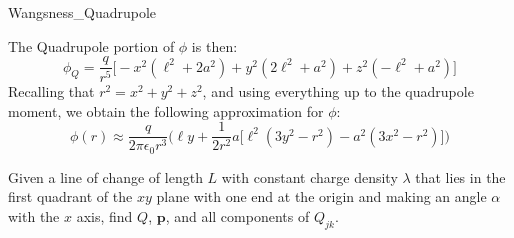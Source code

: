 \begin{solution}
\begin{table}[H]
{                               Wangsness_Quadrupole}
                    \end{table}
                    The Quadrupole portion of $\phi$ is then:
                    \begin{equation}
                        \phi_{Q}=\frac{q}{r^{5}}\Big[
                            \minus{x}^{2}(\ell^{2}+2a^{2})
                            +y^{2}(2\ell^{2}+a^{2})
                            +z^{2}(\minus\ell^{2}+a^{2})\Big]
                    \end{equation}
                    Recalling that $r^{2}=x^{2}+y^{2}+z^{2}$, and using
                    everything up to the quadrupole moment, we obtain
                    the following approximation for $\phi$:
                    \begin{equation}
                        \phi(r)\approx
                            \frac{q}{2\pi\epsilon_{0}r^{3}}
                            \Big(
                                \ell{y}+\frac{1}{2r^{2}}a\big[
                                \ell^{2}(3y^{2}-r^{2})
                                -a^{2}(3x^{2}-r^{2})\big]
                            \Big)
                    \end{equation}
                \end{solution}
                \begin{problem}
                    Given a line of change of length $L$ with constant
                    charge density $\lambda$ that lies in the first
                    quadrant of the $xy$ plane with one end at the
                    origin and making an angle $\alpha$ with the $x$
                    axis, find $Q$, $\mathbf{p}$, and all components of
                    $Q_{jk}$. 
                \end{problem}
